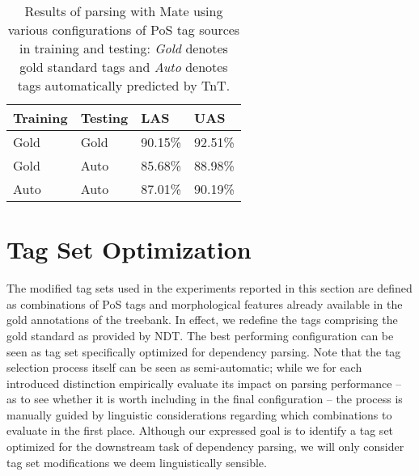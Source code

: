\documentclass[11pt,a4paper]{article}
\begin{document}
\begin{table}
    \centering
    \smaller[0.5]
    \begin{tabular}{@{}llll@{}}
        \toprule
        \textbf{Training} & \textbf{Testing} & \textbf{LAS} & \textbf{UAS} \\
        \midrule
        Gold & Gold & 90.15\% & 92.51\% \\
        Gold & Auto & 85.68\% & 88.98\% \\
        Auto & Auto & 87.01\% & 90.19\% \\
        \bottomrule
    \end{tabular}
    \caption{Results of parsing with Mate using various configurations of PoS
      tag sources in training and testing: \emph{Gold} denotes gold standard
      tags and \emph{Auto} denotes tags automatically predicted by TnT.}
    \label{tagconfigeval}
\end{table}




\section{Tag Set Optimization}
\label{sec:optimization}

The modified tag sets used in the experiments reported in this section are
defined as combinations of PoS tags and morphological features already
available in the gold annotations of the treebank. In effect, we redefine the
tags comprising the gold standard as provided by NDT. The best performing
configuration can be seen as tag set specifically optimized for dependency
parsing. Note that the tag selection process itself can be seen as
semi-automatic; while we for each introduced distinction empirically evaluate
its impact on parsing performance -- as to see whether it is worth including in
the final configuration -- the process is manually guided by linguistic
considerations regarding which combinations to evaluate in the first place.
Although our expressed goal is to identify a tag set optimized for the
downstream task of dependency parsing, we will only consider tag set
modifications we deem linguistically sensible.
\end{document}
